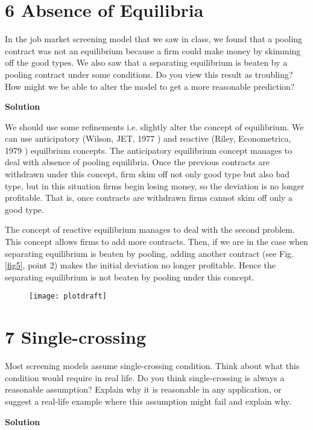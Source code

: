 \documentclass[a4paper]{article}
\begin{document}
		
		\section*{6 Absence of Equilibria}
			In the job market screening model that we saw in class, we found that a pooling contract
			was not an equilibrium because a firm could make money by skimming off the good types.
			We also saw that a separating equilibrium is beaten by a pooling contract under some
			conditions. Do you view this result as troubling? How might we be able to alter the
			model to get a more reasonable prediction?

			
			
			\textbf{Solution}
			
			We should use some refinements i.e. slightly alter the concept of equilibrium. We can use anticipatory (Wilson, JET, 1977 ) and reactive (Riley, Econometrica, 1979 ) equilbrium concepts. The anticipatory equilibrium concept manages to deal with absence of pooling equilibria. Once the previous contracts are withdrawn under this concept, firm skim off not only good type but also bad type, but in this situation firms begin losing money, so the deviation is no longer profitable. That is, once contracts are withdrawn firms cannot skim off only a good type.
			
			The concept of reactive equilibrium manages to deal with the second problem. This concept allows firms to add more contracts. Then, if we are in the case when separating equilibrium is beaten by pooling, adding another contract (see Fig. \eqref{fig5}, point 2) makes the initial deviation no longer profitable. Hence the separating equilibrium is not beaten by pooling under this concept.
				\begin{figure}[H]
				\centering
				\texttt{[image: plotdraft]}
				\caption{}\label{fig5}
			\end{figure}
		
		
		\section*{7 Single-crossing}
			Most screening models assume single-crossing condition. Think about what this condition
			would require in real life. Do you think single-crossing is always a reasonable assumption?
			Explain why it is reasonable in any application, or suggest a real-life example where this assumption might fail and explain why.
			
			
			\textbf{Solution}
			
\end{document}
